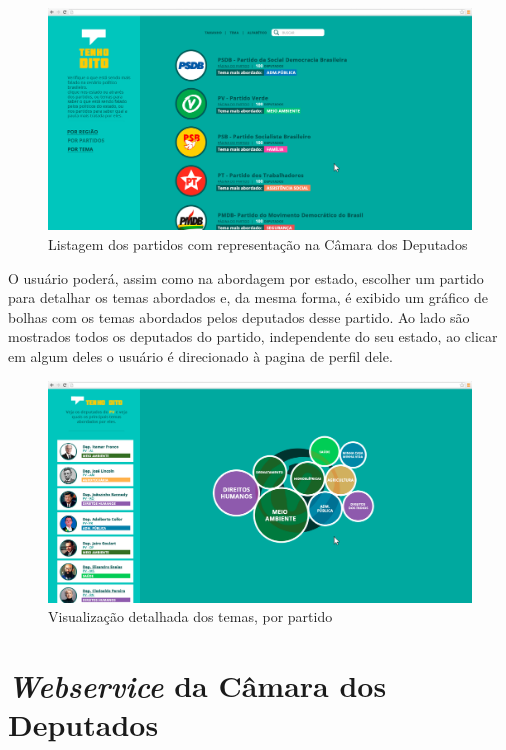 \begin{apendicesenv}
\begin{figure}[h]
  \centering
  \includegraphics[scale=0.2]{figuras/tenhodito4.eps}
  \caption{Listagem dos partidos com representação na Câmara dos Deputados}
  \label{tenhodito4}
\end{figure}

O usuário poderá, assim como na abordagem por estado, escolher um partido para detalhar os temas abordados e, da mesma forma, é exibido um gráfico de bolhas com os temas abordados pelos deputados desse partido. Ao lado são mostrados todos os deputados do partido, independente do seu estado, ao clicar em algum deles o usuário é direcionado à pagina de perfil dele.

\begin{figure}[h]
  \centering
  \includegraphics[scale=0.2]{figuras/tenhodito5.eps}
  \caption{Visualização detalhada dos temas, por partido}
  \label{tenhodito5}
\end{figure}

\chapter{\textit{Webservice} da Câmara dos Deputados}
\label{estrutura-webservice}


\end{apendicesenv}
